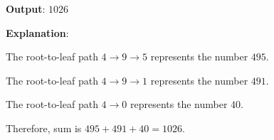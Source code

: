 \begin{flushleft}
\begin{figure}[H]
\end{figure}

\textbf{Output}: $1026$

\textbf{Explanation}:

The root-to-leaf path $ 4\longrightarrow9\longrightarrow5 $ represents the number $ 495 $.

The root-to-leaf path $4\longrightarrow 9\longrightarrow 1$ represents the number $ 491 $.

The root-to-leaf path $4\longrightarrow 0$ represents the number $ 40 $.

Therefore, sum is $495 + 491 + 40 = 1026$.
\end{flushleft}